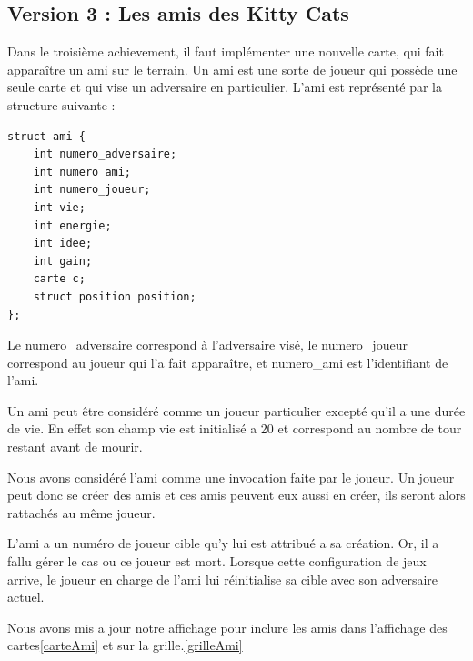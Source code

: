 \documentclass[10pt,a4paper]{article}
\begin{document}
\newpage
\subsection{Version 3 : Les amis des Kitty Cats}
Dans le troisième achievement, il faut implémenter une nouvelle carte, qui fait apparaître un ami sur le terrain. Un ami est une sorte de joueur qui possède une seule carte et qui vise un adversaire en particulier. 
L'ami est représenté par la structure suivante : 
\begin{verbatim}
struct ami {
    int numero_adversaire;
    int numero_ami;
    int numero_joueur;
    int vie;
    int energie;
    int idee;
    int gain;
    carte c;
    struct position position;
};
\end{verbatim}

Le numero\_adversaire correspond à l'adversaire visé, le numero\_joueur correspond au joueur qui l'a fait apparaître, et numero\_ami est l'identifiant de l'ami. 

Un ami peut être considéré comme un joueur particulier excepté qu'il a une durée de vie.  En effet son champ vie est initialisé a 20 et correspond au nombre de tour restant avant de mourir.

Nous avons considéré l'ami comme une invocation faite par le joueur. Un joueur peut donc se créer des amis et ces amis peuvent eux aussi en créer, ils seront alors rattachés au même joueur.  

L'ami a un numéro de joueur cible qu'y lui est attribué a sa création. Or, il a fallu gérer le cas ou ce joueur est mort. Lorsque cette configuration de jeux arrive, le joueur en charge de l'ami lui réinitialise sa cible avec son adversaire actuel.

Nous avons mis a jour notre affichage pour inclure les amis dans l'affichage des cartes\ref{carteAmi} et sur la grille.\ref{grilleAmi}
\end{document}
